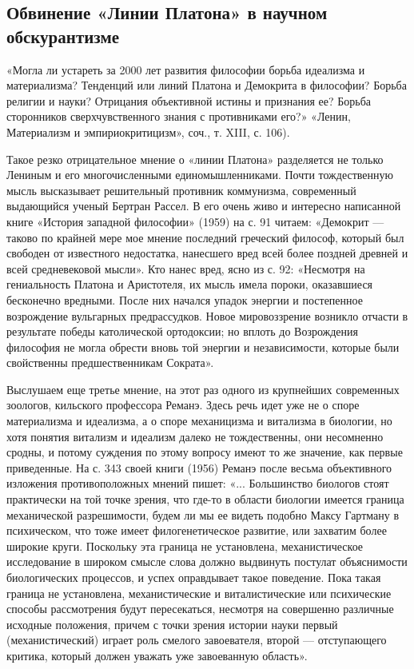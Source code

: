 \subsection{Обвинение «Линии Платона» в научном обскурантизме}

«Могла ли устареть за 2000 лет развития философии борьба идеализма и
материализма? Тенденций или линий Платона и Демокрита в философии?
Борьба религии и науки? Отрицания объективной истины и признания ее?
Борьба сторонников сверхчувственного знания с противниками его?»
«Ленин, Материализм и эмпириокритицизм», соч., т. XIII, с. 106).

Такое резко отрицательное мнение о «линии Платона» разделяется не
только Лениным и его многочисленными единомышленниками. Почти
тождественную мысль высказывает решительный противник коммунизма,
современный выдающийся ученый Бертран Рассел. В его очень живо и
интересно написанной книге «История западной философии» (1959) на с.
91 читаем: «Демокрит --- таково по крайней мере мое мнение последний
греческий философ, который был свободен от известного недостатка,
нанесшего вред всей более поздней древней и всей средневековой мысли».
Кто нанес вред, ясно из с. 92: «Несмотря на гениальность Платона и
Аристотеля, их мысль имела пороки, оказавшиеся бесконечно вредными.
После них начался упадок энергии и постепенное возрождение вульгарных
предрассудков. Новое мировоззрение возникло отчасти в результате
победы католической ортодоксии; но вплоть до Возрождения философия не
могла обрести вновь той энергии и независимости, которые были
свойственны предшественникам Сократа».

Выслушаем еще третье мнение, на этот раз одного из крупнейших
современных зоологов, кильского профессора Реманэ. Здесь речь идет уже
не о споре материализма и идеализма, а о споре механицизма и витализма
в биологии, но хотя понятия витализм и идеализм далеко не
тождественны, они несомненно сродны, и потому суждения по этому
вопросу имеют то же значение, как первые приведенные. На с. 343 своей
книги (1956) Реманэ после весьма объективного изложения
противоположных мнений пишет: «... Большинство биологов стоят
практически на той точке зрения, что где-то в области биологии имеется
граница механической разрешимости, будем ли мы ее видеть подобно Максу
Гартману в психическом, что тоже имеет филогенетическое развитие, или
захватим более широкие круги. Поскольку эта граница не установлена,
механистическое исследование в широком смысле слова должно выдвинуть
постулат объяснимости биологических процессов, и успех оправдывает
такое поведение. Пока такая граница не установлена, механистические и
виталистические или психические способы рассмотрения будут
пересекаться, несмотря на совершенно различные исходные положения,
причем с точки зрения истории науки первый (механистический) играет
роль смелого завоевателя, второй --- отступающего критика, который
должен уважать уже завоеванную область».

